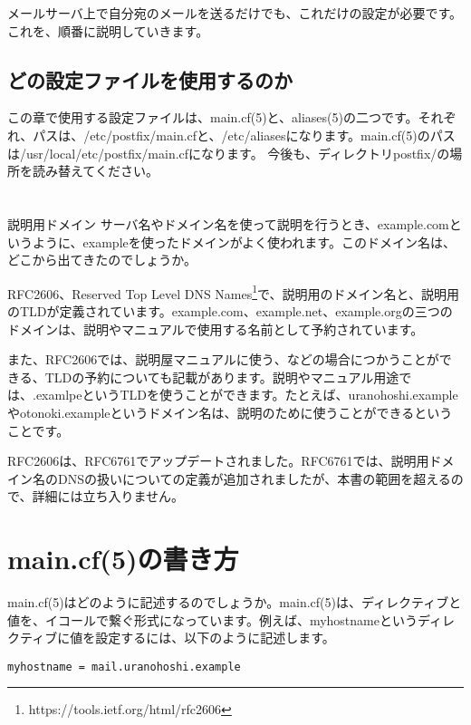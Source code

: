 メールサーバ上で自分宛のメールを送るだけでも、これだけの設定が必要です。これを、順番に説明していきます。



\subsection{どの設定ファイルを使用するのか}

この章で使用する設定ファイルは、main.cf(5)と、aliases(5)の二つです。それぞれ、パスは、/etc/postfix/main.cfと、/etc/aliasesになります。main.cf(5)のパスは/usr/local/etc/postfix/main.cfになります。
今後も、ディレクトリpostfix/の場所を読み替えてください。

\section*{}
\begin{itembox}[l]{説明用ドメイン}
サーバ名やドメイン名を使って説明を行うとき、example.comというように、exampleを使ったドメインがよく使われます。このドメイン名は、どこから出てきたのでしょうか。

RFC2606、Reserved Top Level DNS Names\footnote{https://tools.ietf.org/html/rfc2606}で、説明用のドメイン名と、説明用のTLDが定義されています。example.com、example.net、example.orgの三つのドメインは、説明やマニュアルで使用する名前として予約されています。

また、RFC2606では、説明屋マニュアルに使う、などの場合につかうことができる、TLDの予約についても記載があります。説明やマニュアル用途では、.examlpeというTLDを使うことができます。たとえば、uranohoshi.exampleやotonoki.exampleというドメイン名は、説明のために使うことができるということです。

RFC2606は、RFC6761でアップデートされました。RFC6761では、説明用ドメイン名のDNSの扱いについての定義が追加されましたが、本書の範囲を超えるので、詳細には立ち入りません。

\end{itembox}


\section{main.cf(5)の書き方}
main.cf(5)はどのように記述するのでしょうか。main.cf(5)は、ディレクティブと値を、イコールで繋ぐ形式になっています。例えば、myhostnameというディレクティブに値を設定するには、以下のように記述します。

\begin{lstlisting}[basicstyle=\ttfamily\footnotesize, frame=single]
myhostname = mail.uranohoshi.example
\end{lstlisting}

